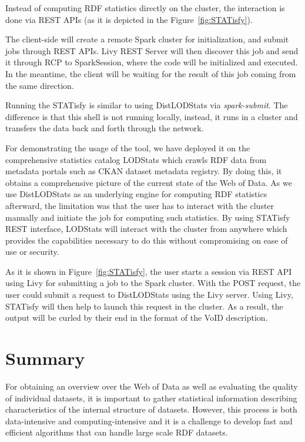 Instead of computing \gls{RDF} statistics directly on the cluster, the interaction is done via REST APIs (as it is depicted in the Figure~\ref{fig:STATisfy}).

The client-side will create a remote Spark cluster for initialization, and submit jobs through REST APIs. 
Livy REST Server will then discover this job and send it through \gls{RCP} to SparkSession, where the code will be initialized and executed.
In the meantime, the client will be waiting for the result of this job coming from the same direction.

Running the STATisfy is similar to using DistLODStats via \textit{spark-submit}.
The difference is that this shell is not running locally, instead, it runs in a cluster and transfers the data back and forth through the network.

For demonstrating the usage of the tool, we have deployed it on the comprehensive statistics catalog LODStats which crawls \gls{RDF} data from metadata portals such as CKAN dataset metadata registry. 
By doing this, it obtains a comprehensive picture of the current state of the Web of Data.
As we use DistLODStats as an underlying engine for computing \gls{RDF} statistics afterward, the limitation was that the user has to interact with the cluster manually and initiate the job for computing such statistics.
By using STATisfy REST interface, LODStats will interact with the cluster from anywhere which provides the capabilities necessary to do this without compromising on ease of use or security.

As it is shown in Figure~\ref{fig:STATisfy}, the user starts a session via REST \gls{API} using Livy for submitting a job to the Spark cluster.
With the POST request, the user could submit a request to DistLODStats using the Livy server. 
Using Livy, STATisfy will then help to launch this request in the cluster.
As a result, the output will be curled by their end in the format of the VoID description.


\section{Summary}
\label{sec:distlodstats-summary}
For obtaining an overview over the Web of Data as well as evaluating the quality of individual datasets, it is important to gather statistical information describing characteristics of the internal structure of datasets.
However, this process is both data-intensive and computing-intensive and it is a challenge to develop fast and efficient algorithms that can handle large scale \gls{RDF} datasets.

